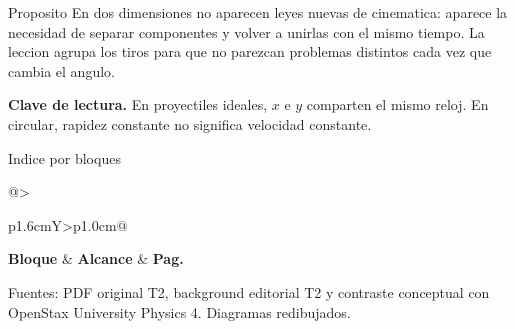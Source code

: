 \documentclass[10pt,a4paper]{article}
\begin{document}
\shorthandoff{<>}
\color{Ink}


\begin{lessoncard}{Proposito}
En dos dimensiones no aparecen leyes nuevas de cinematica: aparece la necesidad de separar componentes y volver a unirlas con el mismo tiempo. La leccion agrupa los tiros para que no parezcan problemas distintos cada vez que cambia el angulo.
\begin{keybox}
\textbf{Clave de lectura.} En proyectiles ideales, $x$ e $y$ comparten el mismo reloj. En circular, rapidez constante no significa velocidad constante.
\end{keybox}
\end{lessoncard}

\begin{lessoncard}{Indice por bloques}
\footnotesize
\begin{tabularx}{\linewidth}{@{}>{\raggedright\arraybackslash}p{1.6cm}Y>{\raggedleft\arraybackslash\bfseries}p{1.0cm}@{}}
\textbf{Bloque} & \textbf{Alcance} & \textbf{Pag.}\\
\midrule
{}
\end{tabularx}
\end{lessoncard}

{\scriptsize\textcolor{Muted}{Fuentes: PDF original T2, background editorial T2 y contraste conceptual con OpenStax University Physics 4. Diagramas redibujados.}}

\clearpage
\end{document}
